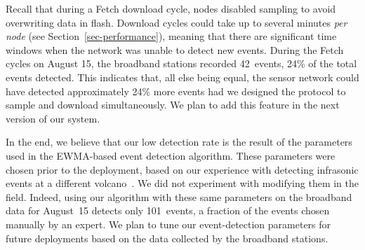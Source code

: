 


Recall that during a Fetch download cycle, nodes disabled sampling to
avoid overwriting data in flash. Download cycles could take up to
several minutes {\em per node} (see Section~\ref{sec-performance}), meaning
that there are significant time windows when the network was unable to
detect new events. During the Fetch cycles on August 15, the broadband
stations recorded 42~events, 24\% of the total events detected. 
This indicates that, all else being equal, the sensor network could
have detected approximately 24\% more events had we designed the
protocol to sample and download simultaneously. We plan to add this
feature in the next version of our system.

In the end, we believe that our low detection rate is the result of
the parameters used in the EWMA-based event detection algorithm.
These parameters were chosen prior to the deployment, based on our 
experience with detecting infrasonic events at a different
volcano~\cite{volcano-ewsn05}. We did not experiment with modifying 
them in the field. Indeed,
using our algorithm with these same parameters 
on the broadband data for August~15 detects only
101~events, a fraction of the events chosen manually by an expert. 
We plan to tune our event-detection parameters for future deployments
based on the data collected by the broadband stations.


